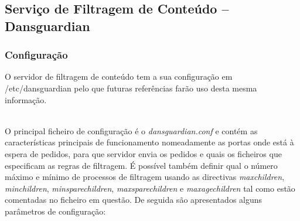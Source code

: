 \subsection{Serviço de Filtragem de Conteúdo -- Dansguardian}

\subsubsection{Configuração}

O servidor de filtragem de conteúdo tem a sua configuração em
/etc/dansguardian pelo que futuras referências farão uso desta
mesma informação.

~\\

O principal ficheiro de configuração é o \emph{dansguardian.conf} e
contém as características principais de funcionamento nomeadamente as
portas onde está à espera de pedidos, para que servidor envia os
pedidos e quais os ficheiros que especificam as regras de filtragem.
É possível também definir qual o número máximo e mínimo de processos
de filtragem usando as directivas \emph{maxchildren},
\emph{minchildren}, \emph{minsparechildren}, \emph{maxsparechildren}
e \emph{maxagechildren} tal como estão comentadas no ficheiro em
questão.
De seguida são apresentados alguns parâmetros de configuração:

